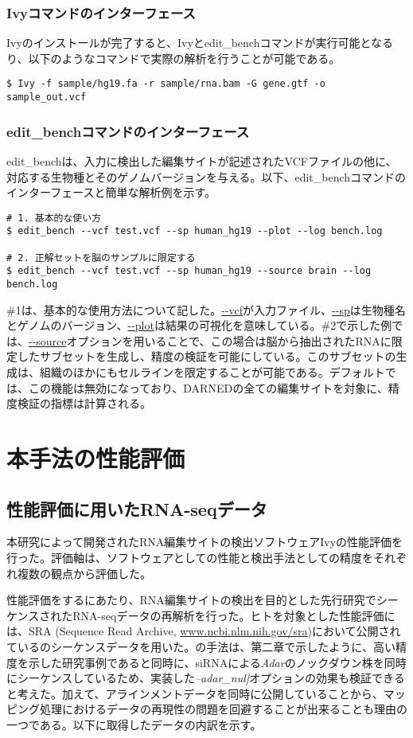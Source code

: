\subsubsection{Ivyコマンドのインターフェース}
Ivyのインストールが完了すると、Ivyとedit\_benchコマンドが実行可能となるり、以下のようなコマンドで実際の解析を行うことが可能である。

{\small
\begin{verbatim}
$ Ivy -f sample/hg19.fa -r sample/rna.bam -G gene.gtf -o sample_out.vcf
\end{verbatim}
}

\subsubsection{edit\_benchコマンドのインターフェース}
edit\_benchは、入力に検出した編集サイトが記述されたVCFファイルの他に、対応する生物種とそのゲノムバージョンを与える。以下、edit\_benchコマンドのインターフェースと簡単な解析例を示す。
{\small
\begin{verbatim}
# 1. 基本的な使い方
$ edit_bench --vcf test.vcf --sp human_hg19 --plot --log bench.log

# 2. 正解セットを脳のサンプルに限定する
$ edit_bench --vcf test.vcf --sp human_hg19 --source brain --log bench.log
\end{verbatim}
\label{fig:edit_usage}
}

\#1は、基本的な使用方法について記した。\url{--vcf}が入力ファイル、\url{--sp}は生物種名とゲノムのバージョン、\url{--plot}は結果の可視化を意味している。\#2で示した例では、\url{--source}オプションを用いることで、この場合は脳から抽出されたRNAに限定したサブセットを生成し、精度の検証を可能にしている。このサブセットの生成は、組織のほかにもセルラインを限定することが可能である。デフォルトでは、この機能は無効になっており、DARNEDの全ての編集サイトを対象に、精度検証の指標は計算される。

\newpage

\section{本手法の性能評価}
\subsection{性能評価に用いたRNA-seqデータ}
本研究によって開発されたRNA編集サイトの検出ソフトウェアIvyの性能評価を行った。評価軸は、ソフトウェアとしての性能と検出手法としての精度をそれぞれ複数の観点から評価した。
\par
性能評価をするにあたり、RNA編集サイトの検出を目的とした先行研究でシーケンスされたRNA-seqデータの再解析を行った。ヒトを対象とした性能評価には、SRA (Sequence Read Archive, \url{www.ncbi.nlm.nih.gov/sra})において公開されている\cite{BahLeeLi1201}のシーケンスデータを用いた。\cite{BahLeeLi1201}の手法は、第二章で示したように、高い精度を示した研究事例であると同時に、siRNAによる\textit{Adar}のノックダウン株を同時にシーケンスしているため、実装した\textit{--adar\_nul]}オプションの効果も検証できると考えた。加えて、アラインメントデータを同時に公開していることから、マッピング処理におけるデータの再現性の問題を回避することが出来ることも理由の一つである。以下に取得したデータの内訳を示す。

